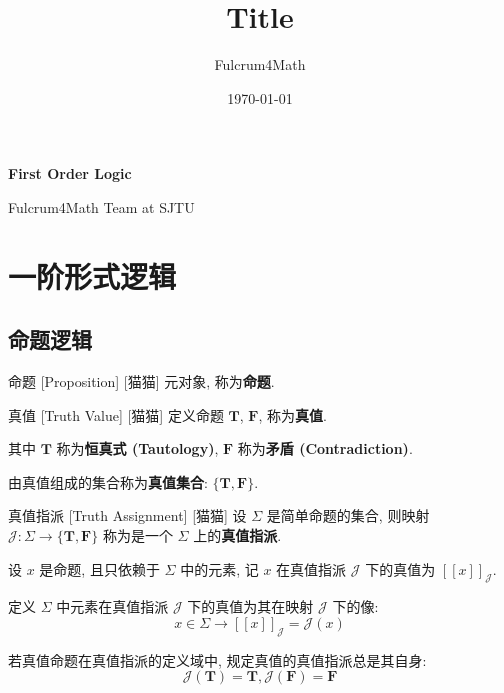 \documentclass[UTF8]{ctexart}
\title{Title}
\author{Fulcrum4Math}
\date{\today}
\newcommand{\LT}{\ensuremath{\mathbf{T}}}
\newcommand{\LF}{\ensuremath{\mathbf{F}}}
\newcommand{\assign}[2]{\ensuremath{{[\![#1]\!]}_{#2}}}
\begin{document}
    \begin{center}
        {\LARGE\textbf{First Order Logic}}

        Fulcrum4Math Team at SJTU
    \end{center}

    \section{一阶形式逻辑}

        \subsection{命题逻辑}

            \begin{dfn}
                []
                {命题}
                [Proposition]
                [猫猫]
                元对象, 称为\textbf{命题}. 
            \end{dfn}

            \begin{dfn}
                []
                {真值}
                [Truth Value]
                [猫猫]
                定义命题 \(\LT\), \(\LF\), 称为\textbf{真值}. 

                其中 \(\LT\) 称为\textbf{恒真式 (Tautology)}, \(\LF\) 称为\textbf{矛盾 (Contradiction)}. 

                由真值组成的集合称为\textbf{真值集合}: \(\{\LT,\LF\}\). 
            \end{dfn}

            \begin{dfn}
                []
                {真值指派}
                [Truth Assignment]
                [猫猫]
                设 \(\Sigma\) 是简单命题的集合, 则映射 \(\mathcal{J}:\Sigma\to\{\LT,\LF\}\) 称为是一个 \(\Sigma\) 上的\textbf{真值指派}. 

                设 \(x\) 是命题, 且只依赖于 \(\Sigma\) 中的元素, 记 \(x\) 在真值指派 \(\mathcal{J}\) 下的真值为 \(\assign{x}{\mathcal{J}}\). 

                定义 \(\Sigma\) 中元素在真值指派 \(\mathcal{J}\) 下的真值为其在映射 \(\mathcal{J}\) 下的像: 
                \[x\in\Sigma\to\assign{x}{\mathcal{J}}=\mathcal{J}(x)\]
                
                若真值命题在真值指派的定义域中, 规定真值的真值指派总是其自身: 
                \[\mathcal{J}(\LT)=\LT, \mathcal{J}(\LF)=\LF\]
            \end{dfn}
\end{document}
